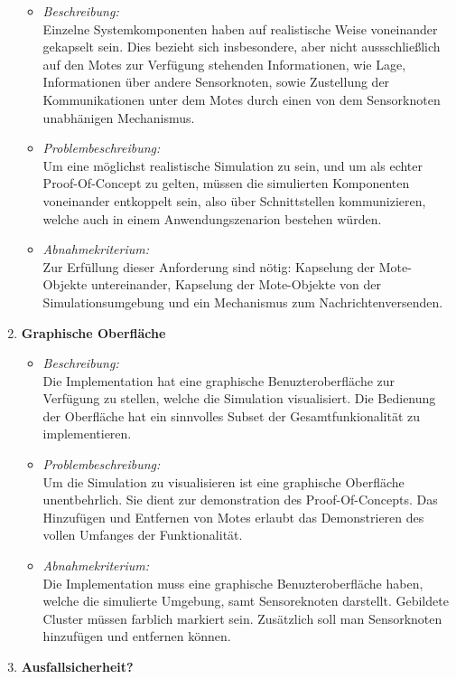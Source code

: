 \begin{enumerate}
  \begin{itemize}
  \item \emph{Beschreibung:}\\
    Einzelne Systemkomponenten haben auf realistische Weise voneinander gekapselt sein.
    Dies bezieht sich insbesondere, aber nicht aussschlie\ss lich auf den Motes zur Verf\"ugung stehenden Informationen, wie Lage, Informationen \"uber andere Sensorknoten, sowie Zustellung der Kommunikationen unter dem Motes durch einen von dem Sensorknoten unabh\"anigen Mechanismus.
  \item \emph{Problembeschreibung:}\\
Um eine m\"oglichst realistische Simulation zu sein, und um als echter Proof-Of-Concept zu gelten, m\"ussen die simulierten Komponenten voneinander entkoppelt sein, also \"uber Schnittstellen kommunizieren, welche auch in einem Anwendungszenarion bestehen w\"urden.
  \item \emph{Abnahmekriterium:}\\
    Zur Erf\"ullung dieser Anforderung sind n\"otig: Kapselung der Mote-Objekte untereinander, Kapselung der Mote-Objekte von der Simulationsumgebung und ein Mechanismus zum Nachrichtenversenden.
  \end{itemize}
\item \textbf{Graphische Oberfl\"ache}
  \begin{itemize}
  \item \emph{Beschreibung:}\\
    Die Implementation hat eine graphische Benuzteroberfl\"ache zur Verf\"ugung zu stellen, welche die Simulation visualisiert. Die Bedienung der Oberfl\"ache hat ein sinnvolles Subset der Gesamtfunkionalit\"at zu implementieren.
  \item \emph{Problembeschreibung:}\\
    Um die Simulation zu visualisieren ist eine graphische Oberfl\"ache unentbehrlich. Sie dient zur demonstration des Proof-Of-Concepts. Das Hinzuf\"ugen und Entfernen von Motes erlaubt das Demonstrieren des vollen Umfanges der Funktionalit\"at.
  \item \emph{Abnahmekriterium:}\\
    Die Implementation muss eine graphische Benuzteroberfl\"ache haben, welche die simulierte Umgebung, samt Sensoreknoten darstellt. Gebildete Cluster m\"ussen farblich markiert sein. Zus\"atzlich soll man Sensorknoten hinzuf\"ugen und entfernen k\"onnen.
  \end{itemize}
\item \textbf{Ausfallsicherheit?}
\end{enumerate}
